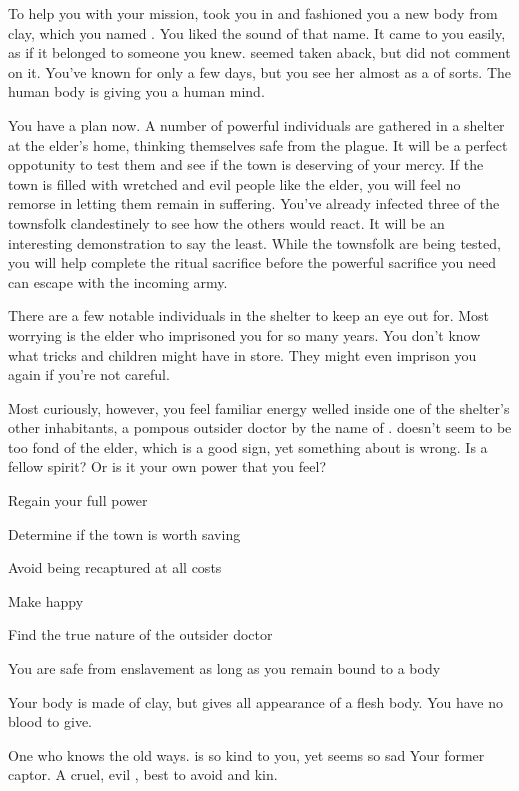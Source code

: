 \documentclass[char]{Pestilence}
\begin{document}
To help you with your mission, \cShaman{} took you in and fashioned you a new body from clay, which you named \cPlaguebearer{}. You liked the sound of that name. It came to you easily, as if it belonged to someone you knew.  \cShaman{} seemed taken aback, but \cShaman{\they} did not comment on it. You've known \cShaman{\them} for only a few days, but you see her almost as a \cShaman{\parent} of sorts. The human body is giving you a human mind.

You have a plan now. A number of powerful individuals are gathered in a shelter at the elder's home, thinking themselves safe from the plague. It will be a perfect oppotunity to test them and see if the town is deserving of your mercy. If the town is filled with wretched and evil people like the elder, you will feel no remorse in letting them remain in suffering. You've already infected three of the townsfolk clandestinely to see how the others would react. It will be an interesting demonstration to say the least. While the townsfolk are being tested, you will help \cShaman{} complete the ritual sacrifice before the powerful sacrifice you need can escape with the incoming army.

There are a few notable individuals in the shelter to keep an eye out for. Most worrying is the elder who imprisoned you for so many years. You don't know what tricks \cElder{\they} and \cElder{\their} children might have in store. They might even imprison you again if you're not careful. 

Most curiously, however, you feel familiar energy welled inside one of the shelter's other inhabitants, a pompous outsider doctor by the name of \cOutsider{}. \cOutsider{\They} doesn't seem to be too fond of the elder, which is a good sign, yet something about \cOutsider{\them} is wrong. Is \cOutsider{\they} a fellow spirit? Or is it your own power that you feel?

\begin{itemz}[Goals]
	\item Regain your full power
	\item Determine if the town is worth saving
	\item Avoid being recaptured at all costs
	\item Make \cShaman{} happy
	\item Find the true nature of the outsider doctor
\end{itemz}

\begin{itemz}[Notes]
	\item You are safe from enslavement as long as you remain bound to a body
	\item Your body is made of clay, but gives all appearance of a flesh body. You have no blood to give.
\end{itemz}

\begin{contacts}
	\contact{\cShaman{}} One who knows the old ways. \cShaman{\They} is so kind to you, yet \cShaman{\they} seems so sad
	\contact{\cElder{}} Your former captor. A cruel, evil \cElder{\human}, best to avoid \cElder{\them} and \cElder{\their} kin.
\end{contacts}
\end{document}
